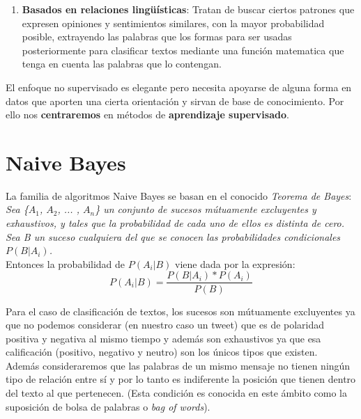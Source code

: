 \documentclass[a4paper,12pt]{report}
\begin{document}
\begin{enumerate}
\begin{enumerate}
	\item \textbf{Basados en relaciones lingüísticas}: Tratan de buscar ciertos patrones que expresen opiniones y sentimientos similares, con la mayor probabilidad posible, extrayendo las palabras que los formas para ser usadas posteriormente para clasificar textos mediante una función matematica que tenga en cuenta las palabras que lo contengan. 

	\end{enumerate}

\end{enumerate}

{\setlength{\parindent}{0cm}
El enfoque no supervisado es elegante pero necesita apoyarse de alguna forma en datos que aporten una cierta orientación y sirvan de base de conocimiento. Por ello nos \textbf{centraremos} en métodos de \textbf{aprendizaje supervisado}.}

\vspace{6mm}
\section{Naive Bayes}

{\setlength{\parindent}{0cm}
La familia de algoritmos Naive Bayes se basan en el conocido \textit{Teorema de Bayes}:} \\

{\setlength{\parindent}{0cm}
\textit{Sea \{$A_1$, $A_2$, ... , $A_n$\} un conjunto de sucesos mútuamente excluyentes y exhaustivos, y tales que la probabilidad de cada uno de ellos es distinta de cero. Sea B un suceso cualquiera del que se conocen las probabilidades condicionales $P(B|A_i)$.}
\vspace{2mm}\\
Entonces la probabilidad de $P(A_i |B)$ viene dada por la expresión:}
\vspace{4mm}
\[ P(A_i | B) = \frac{P(B|A_i) * P(A_i)}{P(B)}  \]

\vspace{4mm}
{\setlength{\parindent}{0cm}
Para el caso de clasificación de textos, los sucesos son mútuamente excluyentes ya que no podemos considerar (en nuestro caso un tweet) que es de polaridad positiva y negativa al mismo tiempo y además son exhaustivos ya que esa calificación (positivo, negativo y neutro) son los únicos tipos que existen.}
\vspace{2mm}\\
Además consideraremos que las palabras de un mismo mensaje no tienen ningún tipo de relación entre sí y por lo tanto es indiferente la posición que tienen dentro del texto al que pertenecen. (Esta condición es conocida en este ámbito como la suposición de bolsa de palabras o \textit{bag of words}). 
\end{document}
